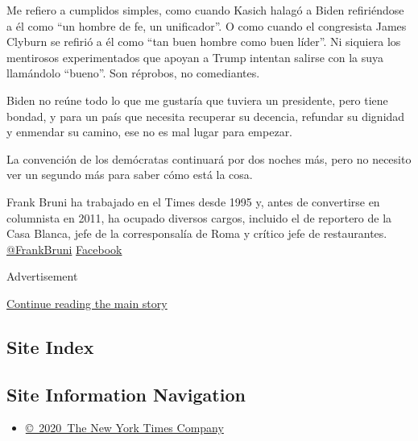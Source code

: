 Me refiero a cumplidos simples, como cuando Kasich halagó a Biden
refiriéndose a él como ``un hombre de fe, un unificador''. O como cuando
el congresista James Clyburn se refirió a él como ``tan buen hombre como
buen líder''. Ni siquiera los mentirosos experimentados que apoyan a
Trump intentan salirse con la suya llamándolo ``bueno''. Son réprobos,
no comediantes.

Biden no reúne todo lo que me gustaría que tuviera un presidente, pero
tiene bondad, y para un país que necesita recuperar su decencia,
refundar su dignidad y enmendar su camino, ese no es mal lugar para
empezar.

La convención de los demócratas continuará por dos noches más, pero no
necesito ver un segundo más para saber cómo está la cosa.

Frank Bruni ha trabajado en el Times desde 1995 y, antes de convertirse
en columnista en 2011, ha ocupado diversos cargos, incluido el de
reportero de la Casa Blanca, jefe de la corresponsalía de Roma y crítico
jefe de restaurantes. \href{https://twitter.com/FrankBruni}{@FrankBruni}
\textbar{}
\href{https://www.facebookcorewwwi.onion/frankbruninyt}{Facebook}

Advertisement

\protect\hyperlink{after-bottom}{Continue reading the main story}

\hypertarget{site-index}{%
\subsection{Site Index}\label{site-index}}

\hypertarget{site-information-navigation}{%
\subsection{Site Information
Navigation}\label{site-information-navigation}}

\begin{itemize}
\tightlist
\item
  \href{https://help.nytimes3xbfgragh.onion/hc/en-us/articles/115014792127-Copyright-notice}{©~2020~The
  New York Times Company}
\end{itemize}

